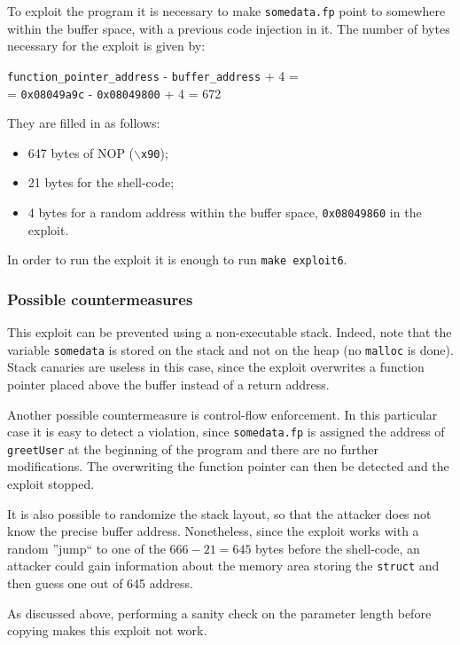 To exploit the program it is necessary to make \texttt{somedata.fp} point to somewhere within the buffer space, with a previous code injection in it. The number of bytes necessary for the exploit is given by:

\begin{center}
	\texttt{function\_pointer\_address} - \texttt{buffer\_address} + 4 = \\
	= \texttt{0x08049a9c} - \texttt{0x08049800} + 4 = 672
\end{center}

They are filled in as follows:
\begin{itemize}
	\item 647 bytes of NOP (\texttt{$\backslash$x90});
	\item 21 bytes for the shell-code;
	\item 4 bytes for a random address within the buffer space, \texttt{0x08049860} in the exploit.
\end{itemize}

In order to run the exploit it is enough to run \texttt{make exploit6}.

\subsubsection{Possible countermeasures}
This exploit can be prevented using a non-executable stack. Indeed, note that the variable \texttt{somedata} is stored on the stack and not on the heap (no \texttt{malloc} is done). Stack canaries are useless in this case, since the exploit overwrites a function pointer placed above the buffer instead of a return address.

Another possible countermeasure is control-flow enforcement. In this particular case it is easy to detect a violation, since \texttt{somedata.fp} is assigned the address of \texttt{greetUser} at the beginning of the program and there are no further modifications. The overwriting the function pointer can then be detected and the exploit stopped.

It is also possible to randomize the stack layout, so that the attacker does not know the precise buffer address. Nonetheless, since the exploit works with a random ''jump`` to one of the $666 - 21 = 645$ bytes before the shell-code, an attacker could gain information about the memory area storing the \texttt{struct} and then guess one out of 645 address.

As discussed above, performing a sanity check on the parameter length before copying makes this exploit not work.

